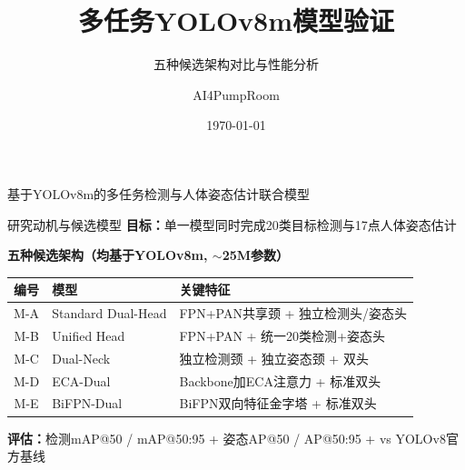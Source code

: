 \documentclass[aspectratio=169, 10pt]{ctexbeamer}
\title{多任务YOLOv8m模型验证}
\subtitle{五种候选架构对比与性能分析}
\author{AI4PumpRoom}
\date{\today}
\begin{document}
\begin{frame}
  \titlepage
  \vfill\centering
  {\small 基于YOLOv8m的多任务检测与人体姿态估计联合模型}
\end{frame}

\begin{frame}{研究动机与候选模型}
  \textbf{目标：}单一模型同时完成\alert{20类目标检测}与\alert{17点人体姿态估计}

  \vspace{0.2cm}
  \textbf{五种候选架构（均基于YOLOv8m, $\sim$25M参数）}

  \vspace{0.15cm}
  \small
  \begin{tabular}{cll}
    \toprule
    编号 & 模型 & 关键特征 \\
    \midrule
    M-A & Standard Dual-Head & FPN+PAN共享颈 + 独立检测头/姿态头 \\
    M-B & Unified Head       & FPN+PAN + 统一20类检测+姿态头 \\
    M-C & Dual-Neck          & 独立检测颈 + 独立姿态颈 + 双头 \\
    M-D & ECA-Dual           & Backbone加ECA注意力 + 标准双头 \\
    M-E & BiFPN-Dual         & BiFPN双向特征金字塔 + 标准双头 \\
    \bottomrule
  \end{tabular}

  \vspace{0.2cm}
  \textbf{评估：}检测mAP@50 / mAP@50:95 + 姿态AP@50 / AP@50:95 + vs YOLOv8官方基线
\end{frame}
\end{document}
